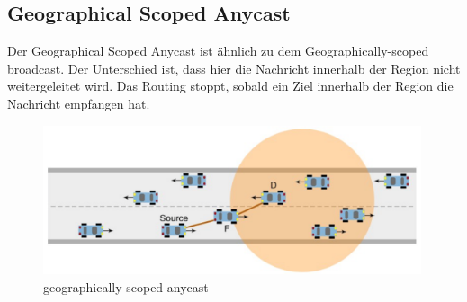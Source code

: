 \subsection{Geographical Scoped Anycast}
Der Geographical Scoped Anycast ist ähnlich zu dem Geographically-scoped broadcast. Der Unterschied ist, dass hier die Nachricht innerhalb der Region nicht weitergeleitet wird. Das Routing stoppt, sobald ein Ziel innerhalb der Region die Nachricht empfangen hat.

\begin{figure}
	\includegraphics[width=0.99\textwidth]{content/images/03_networklayer/GSA.png}
	\caption{geographically-scoped anycast \cite{etsi102636-1}}
	\label{fig:gsa}
\end{figure}


